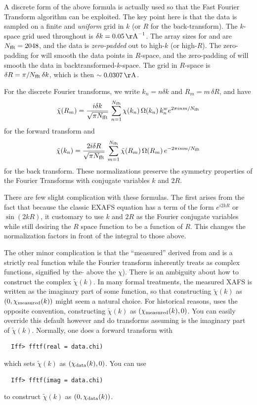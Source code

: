 A discrete form of the above formula is actually used so that the Fast
Fourier Transform algorithm can be exploited.  The key point here is that
the data is sampled on a finite and {\emph{uniform}} grid in $k$ (or $R$
for the back-transform).  The $k$-space grid used throughout {\ifeffit} is
$\delta k=0.05 {\rm\,  \AA}^{-1}$.  The array sizes for {\chik} and {\chir}
are $N_{\rm fft} = 2048$, and the data is {\emph{zero-padded}} out to
high-$k$ (or high-$R$).  The zero-padding for {\chik} will smooth the data
points in $R$-space, and the zero-padding of {\chir} will smooth the data
in backtransformed-$k$-space.  The grid in $R$-space is $\delta R = \pi /
N_{\rm fft}\,\delta k$, which is then $\sim0.0307\,\rm\AA$.

For the discrete Fourier transforms, we write $k_n =n \delta k$ and $R_m = m
\,\delta R$, and have
\begin{equation}
\tilde\chi(R_m) = {{i \delta
    k}\over{\sqrt{\pi N_{\rm fft}}}}\, \sum_{n=1}^{N_{\rm fft}} \chi(k_n)
\, \Omega(k_n) \, k_n^w e^{2\pi i n m/N_{\rm fft}}
\end{equation}
\noindent
for the forward transform and
\begin{equation}
\tilde\chi(k_n) = {{2
    i \delta R}\over{\sqrt{\pi N_{\rm fft}}}}\, \sum_{m=1}^{N_{\rm fft}}
\tilde\chi(R_m) \, \Omega(R_m) \, e^{-2\pi i n m/N_{\rm fft}}
\end{equation}
\noindent
for the back transform.  These normalizations preserve the symmetry
properties of the Fourier Transforms with conjugate variables $k$ and $2R$.


There are few slight complication with these formulas.  The first arises
from the fact that because the classic EXAFS equation has a term of the
form ${e^{i2kR}}$ or $\sin(2kR)$, it customary to use $k$ and $2R$ as the
Fourier conjugate variables while still desiring the $R$ space function to
be a function of $R$.  This changes the normalization factors in front of
the integral to those above.  


The other minor complication is that the ``measured'' {\chik} derived from
{\muE} and is a strictly real function while the Fourier transform
inherently treats {\chik} as complex functions, signified by the $\tilde{ }
$ above the $\chi$).  There is an ambiguity about how to construct the
complex $\tilde\chi(k)$.  In many formal treatments, the measured XAFS is
written as the imaginary part of some function, so that constructing
$\tilde\chi(k)$ as $(0, \chi_{\rm measured}(k))$ might seem a natural
choice.  For historical reasons, {\ifeffit} uses the opposite convention,
constructing $\tilde\chi(k)$ as $(\chi_{\rm measured}(k),0)$.  You can
easily override this default however and do transforms assuming {\chik} is
the imaginary part of $\tilde\chi(k)$.  Normally, one does a forward
transform with
\begin{verbatim}
  Iff> fftf(real = data.chi)
\end{verbatim}
\noindent
which sets $\tilde\chi(k)$ as $(\chi_{\rm data}(k),0)$. You can use
\begin{verbatim}
  Iff> fftf(imag = data.chi)
\end{verbatim}
\noindent
to  construct $\tilde\chi(k)$ as $(0,\chi_{\rm data}(k))$.


